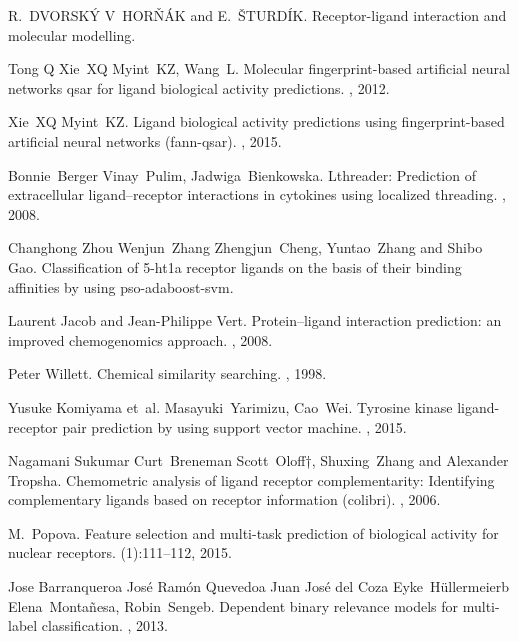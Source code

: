 \documentclass{ITaSconf}
\begin{document}
\begin{thebibliography}{99}
	
	R.~DVORSKÝ V~HORŇÁK and E.~ŠTURDÍK.
	\newblock Receptor-ligand interaction and molecular modelling.
	
	Tong Q Xie~XQ Myint~KZ, Wang~L.
	\newblock Molecular fingerprint-based artificial neural networks qsar for
	ligand biological activity predictions.
	, 2012.
	
	Xie~XQ Myint~KZ.
	\newblock Ligand biological activity predictions using fingerprint-based
	artificial neural networks (fann-qsar).
	, 2015.
	
	Bonnie~Berger Vinay~Pulim, Jadwiga~Bienkowska.
	\newblock Lthreader: Prediction of extracellular ligand–receptor interactions
	in cytokines using localized threading.
	, 2008.
	
	Changhong Zhou Wenjun~Zhang Zhengjun~Cheng, Yuntao~Zhang and Shibo Gao.
	\newblock Classification of 5-ht1a receptor ligands on the basis of their
	binding affinities by using pso-adaboost-svm.
	
	Laurent Jacob and Jean-Philippe Vert.
	\newblock Protein–ligand interaction prediction: an improved chemogenomics
	approach.
	, 2008.
	
	Peter Willett.
	\newblock Chemical similarity searching.
	, 1998.
	
	Yusuke Komiyama et~al. Masayuki~Yarimizu, Cao~Wei.
	\newblock Tyrosine kinase ligand-receptor pair prediction by using support
	vector machine.
	, 2015.
	
	Nagamani Sukumar Curt~Breneman Scott~Oloff†, Shuxing~Zhang and Alexander
	Tropsha.
	\newblock Chemometric analysis of ligand receptor complementarity: Identifying
	complementary ligands based on receptor information (colibri).
	, 2006.
	
	M.~Popova.
	\newblock Feature selection and multi-task prediction of biological activity
	for nuclear receptors.
	(1):111--112, 2015.
	
	Jose Barranqueroa José Ramón Quevedoa Juan José del Coza Eyke~Hüllermeierb
	Elena~Montañesa, Robin~Sengeb.
	\newblock Dependent binary relevance models for multi-label classification.
	, 2013.
	

\end{thebibliography}
\end{document}
